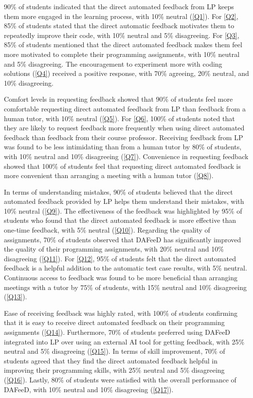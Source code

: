 \documentclass[sigconf,screen,review,anonymous]{acmart}
\begin{document}
90\% of students indicated that the direct automated feedback from LP keeps them more engaged in the learning process, with 10\% neutral (\ref{Q1}).
For \ref{Q2}, 85\% of students stated that the direct automatic feedback motivates them to repeatedly improve their code, with 10\% neutral and 5\% disagreeing.
For \ref{Q3}, 85\% of students mentioned that the direct automated feedback makes them feel more motivated to complete their programming assignments, with 10\% neutral and 5\% disagreeing.
The encouragement to experiment more with coding solutions (\ref{Q4}) received a positive response, with 70\% agreeing, 20\% neutral, and 10\% disagreeing.


Comfort levels in requesting feedback showed that 90\% of students feel more comfortable requesting direct automated feedback from LP than feedback from a human tutor, with 10\% neutral (\ref{Q5}).
For \ref{Q6}, 100\% of students noted that they are likely to request feedback more frequently when using direct automated feedback than feedback from their course professor.
Receiving feedback from LP was found to be less intimidating than from a human tutor by 80\% of students, with 10\% neutral and 10\% disagreeing (\ref{Q7}).
Convenience in requesting feedback showed that 100\% of students feel that requesting direct automated feedback is more convenient than arranging a meeting with a human tutor (\ref{Q8}).


In terms of understanding mistakes, 90\% of students believed that the direct automated feedback provided by LP helps them understand their mistakes, with 10\% neutral (\ref{Q9}).
The effectiveness of the feedback was highlighted by 95\% of students who found that the direct automated feedback is more effective than one-time feedback, with 5\% neutral (\ref{Q10}).
Regarding the quality of assignments, 70\% of students observed that DAFeeD has significantly improved the quality of their programming assignments, with 20\% neutral and 10\% disagreeing (\ref{Q11}).
For \ref{Q12}, 95\% of students felt that the direct automated feedback is a helpful addition to the automatic test case results, with 5\% neutral.
Continuous access to feedback was found to be more beneficial than arranging meetings with a tutor by 75\% of students, with 15\% neutral and 10\% disagreeing (\ref{Q13}).


Ease of receiving feedback was highly rated, with 100\% of students confirming that it is easy to receive direct automated feedback on their programming assignments (\ref{Q14}).
Furthermore, 70\% of students preferred using DAFeeD integrated into LP over using an external AI tool for getting feedback, with 25\% neutral and 5\% disagreeing (\ref{Q15}).
In terms of skill improvement, 70\% of students agreed that they find the direct automated feedback helpful in improving their programming skills, with 25\% neutral and 5\% disagreeing (\ref{Q16}).
Lastly, 80\% of students were satisfied with the overall performance of DAFeeD, with 10\% neutral and 10\% disagreeing (\ref{Q17}).
\end{document}
